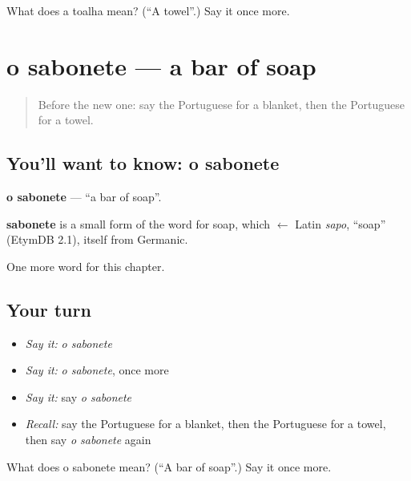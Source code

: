 \begin{tcolorbox}[breakable,colback=teal!4,colframe=teal!35!black,title={Before you move on}]
What does a toalha mean? (\textquotedblleft{}A towel\textquotedblright{}.) Say it once more.
\end{tcolorbox}
\section[o sabonete]{o sabonete — a bar of soap}

\label{lesson:PT-C95-sabonete}



\begin{quote}
Before the new one: say the Portuguese for a blanket, then the Portuguese for a towel.
\end{quote}

\subsection*{You'll want to know: o sabonete}
\textbf{o sabonete} — \textquotedblleft{}a bar of soap\textquotedblright{}.

\begin{cousinweb}
\textbf{sabonete} is a small form of the word for soap, which $\leftarrow$ Latin \emph{sapo}, \textquotedblleft{}soap\textquotedblright{} (EtymDB 2.1), itself from Germanic.
\end{cousinweb}

\begin{grammarlens}[title={What you've built}]
One more word for this chapter.
\end{grammarlens}

\subsection*{Your turn}
\begin{itemize}
\raggedright
  \item \emph{Say it:} \emph{o sabonete}
  \item \emph{Say it:} \emph{o sabonete}, once more
  \item \emph{Say it:} say \emph{o sabonete}
  \item \emph{Recall:} say the Portuguese for a blanket, then the Portuguese for a towel, then say \emph{o sabonete} again
\end{itemize}

\begin{tcolorbox}[breakable,colback=teal!4,colframe=teal!35!black,title={Before you move on}]
What does o sabonete mean? (\textquotedblleft{}A bar of soap\textquotedblright{}.) Say it once more.
\end{tcolorbox}
